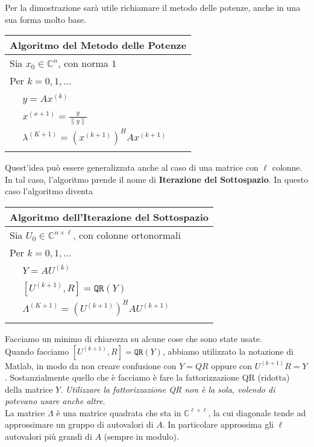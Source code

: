 \documentclass[11pt,a4paper,twoside]{article}
\theoremstyle{definition}
\begin{document}
Per la dimostrazione sarà utile richiamare il metodo delle potenze, anche in una sua forma molto base.

\begin{tabular}{l}
	\\
	\textbf{Algoritmo del Metodo delle Potenze}\\
	\hline
	Sia $x_0 \in \mathbb C^n$, con norma $1$\\
	Per $k = 0,1,...$\\
	$\quad$ $y = Ax^{(k)}$\\
	$\quad$ $x^{(x+1)} = \frac y{\|y\|}$\\
	$\quad$ $\lambda^{(K+1)} = (x^{(k+1)})^H A x^{(k+1)}$\\
	\\
\end{tabular}

Quest'idea può essere generalizzata anche al caso di una matrice con $\ell$ colonne. In tal caso, l'algoritmo prende il nome di \textbf{Iterazione del Sottospazio}. In questo caso l'algoritmo diventa

\begin{tabular}{l}
	\\
	\textbf{Algoritmo dell'Iterazione del Sottospazio}\\
	\hline
	Sia $U_0 \in \mathbb C^{n \times \ell}$, con colonne ortonormali\\
	Per $k = 0,1,...$\\
	$\quad$ $Y = AU^{(k)}$\\
	$\quad$ $[U^{(k+1)}, R] = \mathtt{QR}(Y)$\\
	$\quad$ $\Lambda^{(K+1)} = (U^{(k+1)})^H A U^{(k+1)}$\\
	\\
\end{tabular}

Facciamo un minimo di chiarezza su alcune cose che sono state usate.\\
Quando facciamo $[U^{(k+1)}, R] = \mathtt{QR}(Y)$, abbiamo utilizzato la notazione di Matlab, in modo da non creare confusione con $Y = QR$ oppure con $U^{(k+1)}R = Y$. Sostanzialmente quello che è facciamo è fare la fattorizzazione QR (ridotta) della matrice $Y$. \textit{Utilizzare la fattorizzazione QR non è la sola, volendo di potevano usare anche altre}.\\
La matrice $\Lambda$ è una matrice quadrata che sta in $\mathbb C^{\ell \times \ell}$, la cui diagonale tende ad approssimare un gruppo di autovalori di $A$. In particolare approssima gli $\ell$ autovalori più grandi di $A$ (sempre in modulo).
\end{document}
